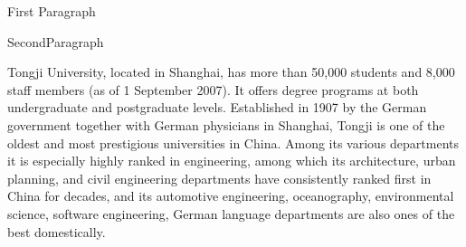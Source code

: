 	First Paragraph
	
	SecondParagraph
	
	Tongji University, located in Shanghai, has more than 50,000 students and 8,000 staff members (as of 1 September 2007). It offers degree programs at both undergraduate and postgraduate levels. Established in 1907 by the German government together with German physicians in Shanghai, Tongji is one of the oldest and most prestigious universities in China. Among its various departments it is especially highly ranked in engineering, among which its architecture, urban planning, and civil engineering departments have consistently ranked first in China for decades, and its automotive engineering, oceanography, environmental science, software engineering, German language departments are also ones of the best domestically.